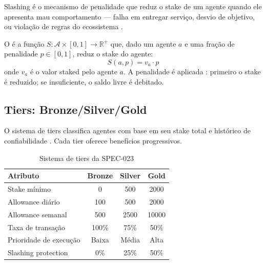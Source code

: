 Slashing é o mecanismo de penalidade que reduz o stake de um
agente quando ele apresenta mau comportamento — falha em entregar
serviço, desvio de objetivo, ou violação de regras do ecossistema
\cite{opencode2026token}.

\begin{definicao}[Slashing]
O  é a função $S: \mathcal{A} \times [0,1] \to
\mathbb{R}^+$ que, dado um agente $a$ e uma fração de penalidade
$p \in [0,1]$, reduz o stake do agente:
\[
S(a, p) = v_a \cdot p
\]
onde $v_a$ é o valor staked pelo agente $a$. A penalidade é
aplicada : primeiro o stake é reduzido;
se insuficiente, o saldo livre é debitado.
\end{definicao}

\subsection{Tiers: Bronze/Silver/Gold}

O sistema de tiers classifica agentes com base em seu stake total
e histórico de confiabilidade \cite{opencode2026token}. Cada tier
oferece benefícios progressivos.

\begin{table}[htb]
\centering
\caption{Sistema de tiers da SPEC-023}
\label{tab:tiers}
\begin{tabular}{lccc}
\toprule
\textbf{Atributo} & \textbf{Bronze} & \textbf{Silver} & \textbf{Gold} \\
\midrule
Stake mínimo & 0 & 500 & 2000 \\
Allowance diário & 100 & 500 & 2000 \\
Allowance semanal & 500 & 2500 & 10000 \\
Taxa de transação & 100\% & 75\% & 50\% \\
Prioridade de execução & Baixa & Média & Alta \\
Slashing protection & 0\% & 25\% & 50\% \\
\bottomrule
\end{tabular}
\end{table}

